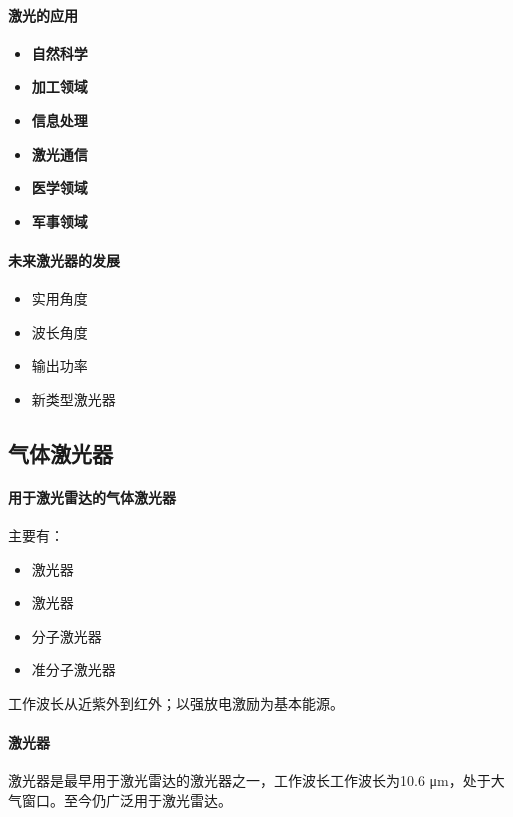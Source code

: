 \paragraph{激光的应用}\begin{itemize}
	\item \textbf{自然科学}
	\item \textbf{加工领域}
	\item \textbf{信息处理}
	\item \textbf{激光通信}
	\item \textbf{医学领域}
	\item \textbf{军事领域}
\end{itemize}

\paragraph{未来激光器的发展}
\begin{itemize}
	\item 实用角度
	\item 波长角度
	\item 输出功率
	\item 新类型激光器
\end{itemize}

\subsection{气体激光器} %
\paragraph{用于激光雷达的气体激光器}主要有：\begin{itemize}
	\item {}激光器
	\item {}激光器
	\item {}分子激光器
	\item 准分子激光器
\end{itemize}

工作波长从近紫外到红外；以强放电激励为基本能源。

\paragraph{激光器}激光器是最早用于激光雷达的激光器之一，工作波长工作波长为10.6 μm，处于大气窗口。至今仍广泛用于激光雷达。

